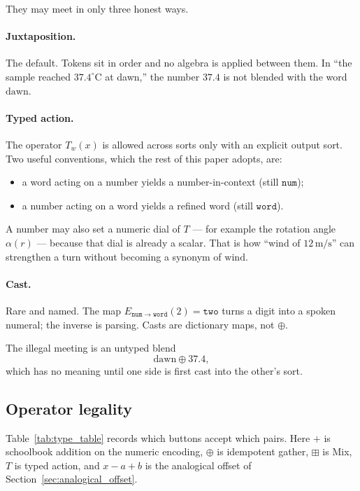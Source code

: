 \documentclass[12pt, a4paper]{article}
\begin{document}
They may meet in only three honest ways.

\paragraph{Juxtaposition.}
The default. Tokens sit in order and no algebra is applied between
them. In ``the sample reached $37.4^\circ\mathrm{C}$ at dawn,'' the
number $37.4$ is not blended with the word $\mathrm{dawn}$.

\paragraph{Typed action.}
The operator $T_w(x)$ is allowed across sorts only with an explicit
output sort. Two useful conventions, which the rest of this paper
adopts, are:
\begin{itemize}
    \item a word acting on a number yields a number-in-context
          (still $\mathtt{num}$);
    \item a number acting on a word yields a refined word
          (still $\mathtt{word}$).
\end{itemize}
A number may also set a numeric dial of $T$ --- for example the
rotation angle $\alpha(r)$ --- because that dial is already a scalar.
That is how ``wind of $12\,\mathrm{m/s}$'' can strengthen a turn
without becoming a synonym of $\mathrm{wind}$.

\paragraph{Cast.}
Rare and named. The map $E_{\mathtt{num}\to\mathtt{word}}(2)=\texttt{two}$
turns a digit into a spoken numeral; the inverse is parsing. Casts are
dictionary maps, not $\oplus$.

The illegal meeting is an untyped blend
\begin{equation}
    \mathrm{dawn} \oplus 37.4,
\end{equation}
which has no meaning until one side is first cast into the other's
sort.

\subsection{Operator legality}
\label{subsec:type_table}
Table~\ref{tab:type_table} records which buttons accept which pairs.
Here $+$ is schoolbook addition on the numeric encoding, $\oplus$ is
idempotent gather, $\boxplus$ is Mix, $T$ is typed action, and $x-a+b$ is the analogical
offset of Section~\ref{sec:analogical_offset}.
\end{document}
